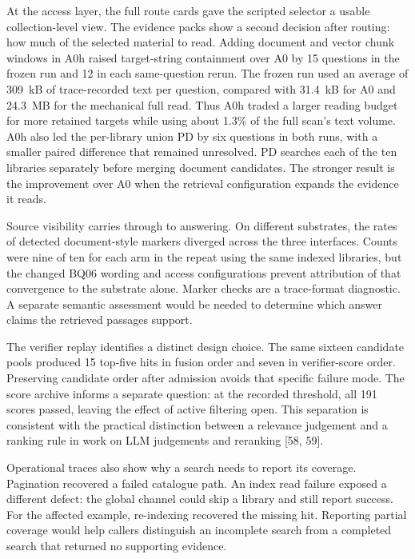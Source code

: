 At the access layer, the full route cards gave the scripted selector a
usable collection-level view. The evidence packs show a second decision
after routing: how much of the selected material to read. Adding document
and vector chunk windows in A0h raised target-string containment over A0 by
15 questions in the frozen run and 12 in each same-question rerun. The
frozen run used an average of 309~kB of trace-recorded text per question,
compared with 31.4~kB for A0 and 24.3~MB for the mechanical full read. Thus
A0h traded a larger reading budget for more retained targets while using
about 1.3\% of the full scan's text volume. A0h also led the per-library
union PD by six questions in both runs, with a smaller paired difference
that remained unresolved. PD searches each of the ten libraries separately
before merging document candidates. The stronger result is the improvement over A0
when the retrieval configuration expands the evidence it reads.

Source visibility carries through to answering. On different substrates,
the rates of detected document-style markers diverged across the three
interfaces. Counts were nine of ten for each arm in the repeat using the same
indexed libraries, but the changed BQ06 wording and access configurations
prevent attribution of that convergence to the substrate alone. Marker checks are a
trace-format diagnostic. A separate semantic assessment would be needed to
determine which answer claims the retrieved passages support.

The verifier replay identifies a distinct design choice. The same sixteen
candidate pools produced 15 top-five hits in fusion order and seven in
verifier-score order. Preserving candidate order after admission avoids
that specific failure mode. The score archive informs a separate question:
at the recorded threshold, all 191 scores passed, leaving the effect of
active filtering open. This separation is consistent with the practical
distinction between a relevance judgement and a ranking rule in work on
LLM judgements and reranking [58, 59].

Operational traces also show why a search needs to report its coverage.
Pagination recovered a failed catalogue path. An index read failure exposed
a different defect: the global channel could skip a library and still report
success. For the affected example, re-indexing recovered the missing hit.
Reporting partial coverage would help callers distinguish an incomplete search
from a completed search that returned no supporting evidence.


